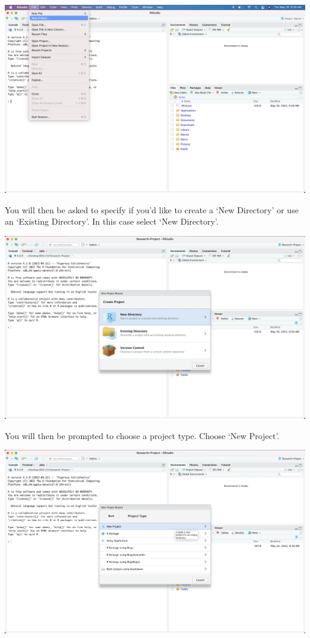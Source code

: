 \documentclass[
]{book}
\begin{document}
\includegraphics{images/D_new-project-1.png}

You will then be asked to specify if you'd like to create a `New Directory' or use an `Existing Directory'. In this case select `New Directory'.

\includegraphics{images/D_new-project-in-new-folder-2.png}

You will then be prompted to choose a project type. Choose `New Project'.

\includegraphics{images/D_new-project-in-new-folder-3.png}
\end{document}
